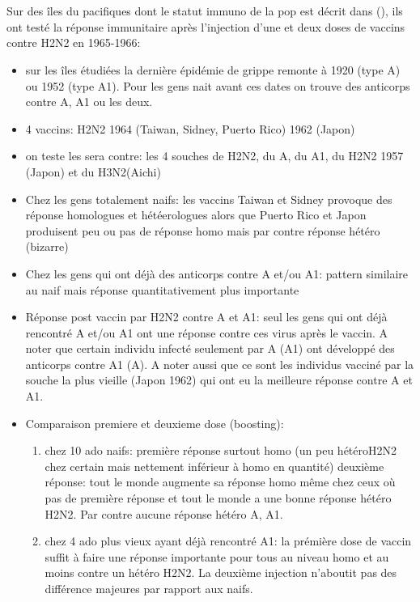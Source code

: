 \documentclass{article}
\begin{document}
\section{\cite{Brown1969a}}
Sur des îles du pacifiques dont le statut immuno de la pop est décrit dans (\cite{Brown1966}), ils ont testé la réponse immunitaire après l'injection d'une et deux doses de vaccins contre H2N2 en 1965-1966:
\begin{itemize}
\item sur les îles étudiées la dernière épidémie de grippe remonte à 1920 (type A) ou 1952 (type A1). Pour les gens nait avant ces dates on trouve des anticorps contre A, A1 ou les deux.
\item 4 vaccins: H2N2 1964 (Taiwan, Sidney, Puerto Rico) 1962 (Japon)
\item on teste les sera contre: les 4 souches de H2N2, du A, du A1, du H2N2 1957 (Japon) et du H3N2(Aichi)
\item Chez les gens totalement naifs: les vaccins Taiwan et Sidney provoque des réponse homologues et hétéerologues alors que Puerto Rico et Japon produisent peu ou pas de réponse homo mais par contre réponse hétéro (bizarre)
\item Chez les gens qui ont déjà des anticorps contre A et/ou A1: pattern similaire au naif mais réponse quantitativement plus importante
\item Réponse post vaccin par H2N2 contre A et A1: seul les gens qui ont déjà rencontré A et/ou A1 ont une réponse contre ces virus après le vaccin. A noter que certain individu infecté seulement par A (A1) ont développé des anticorps contre A1 (A). A noter aussi que ce sont les individus vacciné par la souche la plus vieille (Japon 1962) qui ont eu la meilleure réponse contre A et A1. 
\item Comparaison premiere et deuxieme dose (boosting): 
\begin{enumerate}
\item chez 10 ado naifs: première réponse surtout homo (un peu hétéroH2N2 chez certain mais nettement inférieur à homo en quantité) deuxième réponse: tout le monde augmente sa réponse homo même chez ceux où pas de première réponse et tout le monde a une bonne réponse hétéro H2N2. Par contre aucune réponse hétéro A, A1. 
\item chez 4 ado plus vieux ayant déjà rencontré A1: la prémière dose de vaccin suffit à faire une réponse importante pour tous au niveau homo et au moins contre un hétéro H2N2. La deuxième injection n'aboutit pas des différence majeures par rapport aux naifs.

\end{enumerate}
\end{itemize}
\end{document}
